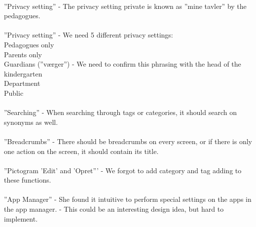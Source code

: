 \\
''Privacy setting'' - The privacy setting private is known as ''mine tavler'' by the pedagogues.\\
\\
''Privacy setting'' - We need 5 different privacy settings: \\
Pedagogues only\\
Parents only\\
Guardians (''værger'') - We need to confirm this phrasing with the head of the kindergarten\\
Department\\
Public\\
\\
''Searching'' - When searching through tags or categories, it should search on synonyms as well.\\
\\
''Breadcrumbs'' - There should be breadcrumbs on every screen, or if there is only one action on the screen, it should contain its title.\\
\\
''Pictogram 'Edit' and 'Opret''' - We forgot to add category and tag adding to these functions.\\
\\
''App Manager'' - She found it intuitive to perform special settings on the apps in the app manager. - This could be an interesting design idea, but hard to implement.











